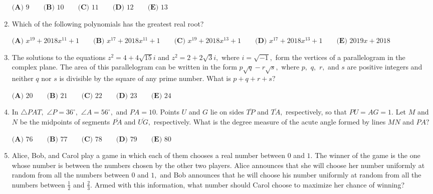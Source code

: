 \documentclass{article}
\begin{document}
\begin{enumerate}[label=\arabic*., itemsep=0.5em]
\(
\textbf{(A) }9 \qquad
\textbf{(B) }10 \qquad
\textbf{(C) }11 \qquad
\textbf{(D) }12 \qquad
\textbf{(E) }13 \qquad
\)\par \vspace{0.5em}\item Which of the following polynomials has the greatest real root?

\(\textbf{(A) }   x^{19}+2018x^{11}+1   \qquad        \textbf{(B) }   x^{17}+2018x^{11}+1   \qquad    \textbf{(C) }   x^{19}+2018x^{13}+1   \qquad   \textbf{(D) }  x^{17}+2018x^{13}+1 \qquad  \textbf{(E) }   2019x+2018 \)\par \vspace{0.5em}\item The solutions to the equations \(z^2=4+4\sqrt{15}i\) and \(z^2=2+2\sqrt 3i,\) where \(i=\sqrt{-1},\) form the vertices of a parallelogram in the complex plane. The area of this parallelogram can be written in the form \(p\sqrt q-r\sqrt s,\) where \(p,\) \(q,\) \(r,\) and \(s\) are positive integers and neither \(q\) nor \(s\) is divisible by the square of any prime number. What is \(p+q+r+s?\)

\(\textbf{(A) } 20 \qquad 
\textbf{(B) } 21 \qquad 
\textbf{(C) } 22 \qquad 
\textbf{(D) } 23 \qquad 
\textbf{(E) } 24 \)\par \vspace{0.5em}\item In \(\triangle PAT,\) \(\angle P=36^{\circ},\) \(\angle A=56^{\circ},\) and \(PA=10.\) Points \(U\) and \(G\) lie on sides \(\overline{TP}\) and \(\overline{TA},\) respectively, so that \(PU=AG=1.\) Let \(M\) and \(N\) be the midpoints of segments \(\overline{PA}\) and \(\overline{UG},\) respectively. What is the degree measure of the acute angle formed by lines \(MN\) and \(PA?\)

\(\textbf{(A) } 76 \qquad 
\textbf{(B) } 77 \qquad 
\textbf{(C) } 78 \qquad 
\textbf{(D) } 79 \qquad 
\textbf{(E) } 80 \)\par \vspace{0.5em}\item Alice, Bob, and Carol play a game in which each of them chooses a real number between \(0\) and \(1.\) The winner of the game is the one whose number is between the numbers chosen by the other two players. Alice announces that she will choose her number uniformly at random from all the numbers between \(0\) and \(1,\) and Bob announces that he will choose his number uniformly at random from all the numbers between \(\tfrac{1}{2}\) and \(\tfrac{2}{3}.\) Armed with this information, what number should Carol choose to maximize her chance of winning?


\end{enumerate}
\end{document}
